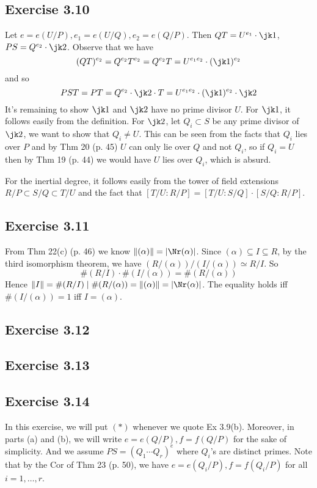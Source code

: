\documentclass[../Chapter.tex]{subfiles}
\begin{document}
\subsection*{Exercise 3.10}

Let $e=e(U/P),e_1=e(U/Q),e_2=e(Q/P)$. Then $QT=U^{e_1}\cdot\jk1$, $PS=Q^{e_2}\cdot\jk2$. Observe that we have $$(QT)^{e_2}=Q^{e_2}T^{e_2}=Q^{e_2}T=U^{e_1e_2}\cdot(\jk1)^{e_2}$$ and so $$PST=PT=Q^{e_2}\cdot\jk2\cdot T=U^{e_1e_2}\cdot(\jk1)^{e_2}\cdot\jk2$$ It's remaining to show $\jk1$ and $\jk2$ have no prime divisor $U$. For $\jk1$, it follows easily from the definition. For $\jk2$, let $Q_i\subset S$ be any prime divisor of $\jk2$, we want to show that $Q_i\neq U$. This can be seen from the facts that $Q_i$ lies over $P$ and by Thm 20 (p. 45) $U$ can only lie over $Q$ and not $Q_i$, so if $Q_i=U$ then by Thm 19 (p. 44) we would have $U$ lies over $Q_i$, which is absurd.

For the inertial degree, it follows easily from the tower of field extensions $R/P\subset S/Q\subset T/U$ and the fact that $[T/U:R/P]=[T/U:S/Q]\cdot[S/Q:R/P]$.

\subsection*{Exercise 3.11}

From Thm 22(c) (p. 46) we know $\|(\alpha)\|=|\Nr(\alpha)|$. Since $(\alpha)\subseteq I \subseteq R$, by the third isomorphism theorem, we have $(R/(\alpha))/(I/(\alpha))\simeq R/I$. So $$\#(R/I)\cdot\#(I/(\alpha))=\#(R/(\alpha))$$ Hence $\|I\|=\#(R/I)\mid \#(R/(\alpha))=\|(\alpha)\|=|\Nr(\alpha)|$. The equality holds iff $\#(I/(\alpha))=1$ iff $I=(\alpha)$.

\subsection*{Exercise 3.12}

\subsection*{Exercise 3.13}

\subsection*{Exercise 3.14}

In this exercise, we will put $(*)$ whenever we quote Ex 3.9(b). Moreover, in parts (a) and (b), we will write $e=e(Q/P),f=f(Q/P)$ for the sake of simplicity. And we assume $PS=(Q_1\cdots Q_r)^e$ where $Q_i$'s are distinct primes. Note that by the Cor of Thm 23 (p. 50), we have $e=e(Q_i/P),f=f(Q_i/P)$ for all $i=1,\ldots,r$.
\end{document}
